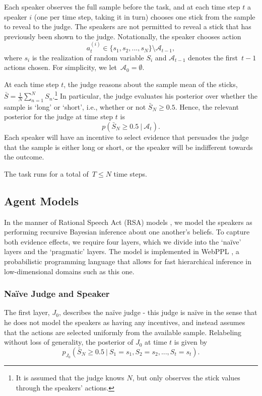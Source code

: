 \documentclass[10pt,letterpaper]{article}
\begin{document}
Each speaker observes the full sample before the task, and at each time step $t$ a speaker
$i$ (one per time step, taking it in turn) chooses one stick from the sample to reveal
to the judge. The speakers are not permitted to reveal a stick that has previously been shown to 
the judge. Notationally, the speaker chooses action 
\begin{equation}
a_t^{(i)} \in \{s_1, s_2, ..., s_N\} \setminus \mathcal{A}_{t-1},
\end{equation}
where $s_i$ is the realization of random variable $S_i$ and $\mathcal{A}_{t-1}$ denotes the first~${t-1}$ 
actions chosen. For simplicity, we let~${\mathcal{A}_0 = \emptyset}$.

At each time step $t$, the judge reasons about the sample mean of the sticks,~${\bar{S} = \frac{1}{N} \sum_{n=1}^N S_n}$.\footnote{It is assumed that the judge knows $N$, but only observes the stick values through the speakers' actions.}
In particular, the judge evaluates his posterior over whether the sample is `long' or `short', i.e., whether or not
$\bar{S	}_N \ge 0.5$. Hence, the relevant posterior for the judge at time step $t$ is
\begin{equation}
p( \bar{S}_N \ge 0.5 \ | \ \mathcal{A}_t ).
\end{equation}
Each speaker will have an incentive to select evidence that persuades the judge that the sample is
either long or short, or the speaker will be indifferent towards the outcome.

The task runs for a total of~${T\le N}$ time steps.

\subsection{Agent Models}
In the manner of Rational Speech Act (RSA) models \cite{goodman_pragmatic_2016}, we model the speakers as performing
recursive Bayesian inference about one another's beliefs. To capture both evidence effects,
we require four layers, which we divide into the `na\"ive' layers and the `pragmatic' layers.
The model is implemented in WebPPL \cite{dippl}, a probabilistic programming language that allows for
fast hierarchical inference in low-dimensional domains such as this one.

\subsubsection{Na\"ive Judge and Speaker}
The first layer, $J_0$, describes the na\"ive judge - this judge is na\"ive in the sense that he
does not model the speakers as having any incentives, and instead assumes that the actions are selected
uniformly from the available sample. Relabeling without loss of generality, the posterior of $J_0$ at time $t$ is given by
\begin{equation}
p_{J_0}( \bar{S}_N \ge 0.5 \ | \ S_1=s_1, S_2=s_2, ..., S_t=s_t).
\end{equation}
\end{document}
